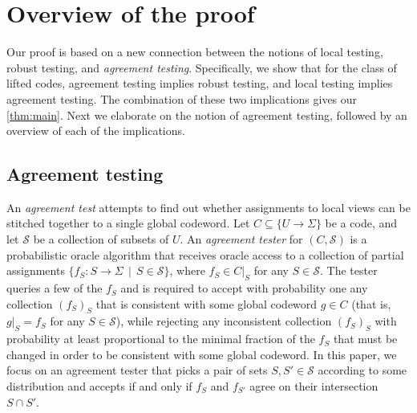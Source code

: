 \documentclass[11pt]{article}
\numberwithin{equation}{section}
\theoremstyle{definition}
\theoremstyle{plain}
\theoremstyle{plain}
\newcommand{\calS}{{\mathcal{S}}}
\begin{document}
%
\section{Overview of the proof}  %
\label{sec:proof-overview}

Our proof is based on a new connection between the notions of local testing, robust testing, and \emph{agreement testing}. Specifically, we show that for the class of lifted codes, %
 agreement testing implies robust testing, and local testing implies agreement testing. The combination of these two implications gives our \cref{thm:main}. Next we elaborate on the notion of agreement testing, followed by an overview of each of the implications.

\subsection{Agreement testing}

An \emph{agreement test} attempts to find out whether
%
%
assignments to local views 
can be stitched together to a single global codeword. Let $C \subseteq \{U \to \Sigma\}$  be a code, and let $\calS$ be a collection of subsets of $U$.
An \emph{agreement tester} for %
$(C, \calS)$   %
%
is a probabilistic oracle algorithm that receives oracle access to a collection of partial assignments $\{f_S:S\to \Sigma \,\mid\, S\in \calS\}$,
%
where $f_S \in C|_S$ for any $S \in \calS$. The tester queries a few of 
%
%
the $f_S$ %
%
and is required to accept with probability one any collection $(f_S)_S$ that is consistent with some global codeword $g \in C$ (that is, $g|_S = f_S$ for any $S \in \calS$), while rejecting any inconsistent collection $(f_S)_S$
with probability
at least  %
proportional to the minimal fraction
%
of the $f_S$  %
that  must be changed in order to be consistent with some global codeword. In this %
paper,   %
we focus on an agreement tester that picks a pair of sets $S,S' \in \calS$ according to some distribution and accepts if and only if $f_S$ and $f_{S'}$ agree on their intersection $S\cap S'$.
\end{document}
